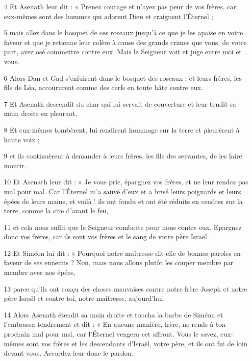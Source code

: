 \par 4 Et Asenath leur dit : « Prenez courage et n'ayez pas peur de vos frères, car eux-mêmes sont des hommes qui adorent Dieu et craignent l'Éternel ;

\par 5 mais allez dans le bosquet de ces roseaux jusqu'à ce que je les apaise en votre faveur et que je retienne leur colère à cause des grands crimes que vous, de votre part, avez osé commettre contre eux. Mais le Seigneur voit et juge entre moi et vous.

\par 6 Alors Dan et Gad s'enfuirent dans le bosquet des roseaux ; et leurs frères, les fils de Léa, accoururent comme des cerfs en toute hâte contre eux.

\par 7 Et Asenath descendit du char qui lui servait de couverture et leur tendit sa main droite en pleurant,

\par 8 Et eux-mêmes tombèrent, lui rendirent hommage sur la terre et pleurèrent à haute voix ;

\par 9 et ils continuèrent à demander à leurs frères, les fils des servantes, de les faire mourir.

\par 10 Et Asenath leur dit : « Je vous prie, épargnez vos frères, et ne leur rendez pas mal pour mal. Car l'Éternel m'a sauvé d'eux et a brisé leurs poignards et leurs épées de leurs mains, et voilà ! ils ont fondu et ont été réduits en cendres sur la terre, comme la cire d'avant le feu,

\par 11 et cela nous suffit que le Seigneur combatte pour nous contre eux. Epargnez donc vos frères, car ils sont vos frères et le sang de votre père Israël.

\par 12 Et Siméon lui dit : « Pourquoi notre maîtresse dit-elle de bonnes paroles en faveur de ses ennemis ? Non, mais nous allons plutôt les couper membre par membre avec nos épées,

\par 13 parce qu'ils ont conçu des choses mauvaises contre notre frère Joseph et notre père Israël et contre toi, notre maîtresse, aujourd'hui.

\par 14 Alors Asenath étendit sa main droite et toucha la barbe de Siméon et l'embrassa tendrement et dit : « En aucune manière, frère, ne rends à ton prochain mal pour mal, car l'Éternel vengera cet affront. Vous le savez, eux-mêmes sont vos frères et les descendants d'Israël, votre père, et ils ont fui de loin devant vous. Accordez-leur donc le pardon.

